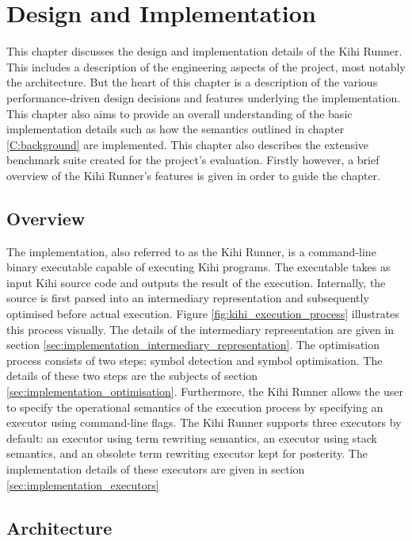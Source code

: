 \chapter{Design and Implementation} \label{C:implementation} 

This chapter discusses the design and implementation details of the Kihi Runner. This includes a description of the engineering aspects of the project, most notably the architecture. But the heart of this chapter is a description of the various performance-driven design decisions and features underlying the implementation. This chapter also aims to provide an overall understanding of the basic implementation details such as how the semantics outlined in chapter \ref{C:background} are implemented. This chapter also describes the extensive benchmark suite created for the project's evaluation. Firstly however, a brief overview of the Kihi Runner's features is given in order to guide the chapter.

\section{Overview}

The implementation, also referred to as the Kihi Runner, is a command-line binary executable capable of executing Kihi programs. The executable takes as input Kihi source code and outputs the result of the execution. Internally, the source is first parsed into an intermediary representation and subsequently optimised before actual execution. Figure \ref{fig:kihi_execution_process} illustrates this process visually. The details of the intermediary representation are given in section \ref{sec:implementation_intermediary_representation}. The optimisation process consists of two steps: symbol detection and symbol optimisation. The details of these two steps are the subjects of section \ref{sec:implementation_optimisation}. Furthermore, the Kihi Runner allows the user to specify the operational semantics of the execution process by specifying an executor using command-line flags. The Kihi Runner supports three executors by default: an executor using term rewriting semantics, an executor using stack semantics, and an obsolete term rewriting executor kept for posterity. The implementation details of these executors are given in section \ref{sec:implementation_executors}

\section{Architecture}


